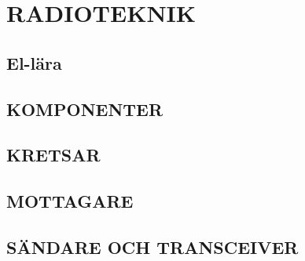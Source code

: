 \documentclass[a4paper,twoside,twocolumn,openright]{book}
\begin{document}
\cleardoublepage
\pagestyle{fancy}
\twocolumn


\tableofcontents

\mainmatter






\part{RADIOTEKNIK}
\chapter{El-lära}











\chapter{KOMPONENTER}










\chapter{KRETSAR}










\chapter{MOTTAGARE}










\chapter{SÄNDARE OCH TRANSCEIVER}


\end{document}
